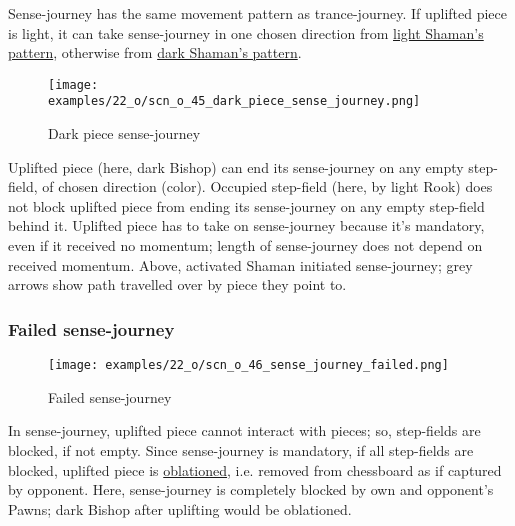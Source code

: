 Sense-journey has the same movement pattern as trance-journey. If uplifted piece
is light, it can take sense-journey in one chosen direction from
\hyperref[fig:scn_cot_52_light_shaman_trance_journey]{light Shaman's pattern},
otherwise from
\hyperref[fig:scn_cot_54_dark_shaman_trance_journey]{dark Shaman's pattern}.

\clearpage %

\vspace*{-2.1\baselineskip}
\noindent
\begin{figure}[!h]
\texttt{[image: examples/22\_o/scn\_o\_45\_dark\_piece\_sense\_journey.png]}
\vspace*{-1.4\baselineskip}
\caption{Dark piece sense-journey}
\label{fig:scn_o_45_dark_piece_sense_journey}
\end{figure}

\vspace*{-0.5\baselineskip}
Uplifted piece (here, dark Bishop) can end its sense-journey on any empty step-field,
of chosen direction (color). Occupied step-field (here, by light Rook) does not block
uplifted piece from ending its sense-journey on any empty step-field behind it.
Uplifted piece has to take on sense-journey because it's mandatory, even if it received
no momentum; length of sense-journey does not depend on received momentum. Above,
activated Shaman initiated sense-journey; grey arrows show path travelled over by
piece they point to.

\clearpage %

\subsubsection*{Failed sense-journey}
\label{sec:One/Starchild/Sense-journey/Failed sense-journey}

\vspace*{-1.4\baselineskip}
\noindent
\begin{figure}[!h]
\texttt{[image: examples/22\_o/scn\_o\_46\_sense\_journey\_failed.png]}
\vspace*{-1.4\baselineskip}
\caption{Failed sense-journey}
\label{fig:scn_o_46_sense_journey_failed}
\end{figure}

\vspace*{-0.5\baselineskip}
In sense-journey, uplifted piece cannot interact with pieces; so, step-fields are
blocked, if not empty. Since sense-journey is mandatory, if all step-fields are
blocked, uplifted piece is \hyperref[sec:Terms/Oblation]{oblationed}, i.e. removed
from chessboard as if captured by opponent. \newline
\indent
Here, sense-journey is completely blocked by own and opponent's Pawns; dark Bishop
after uplifting would be oblationed.


